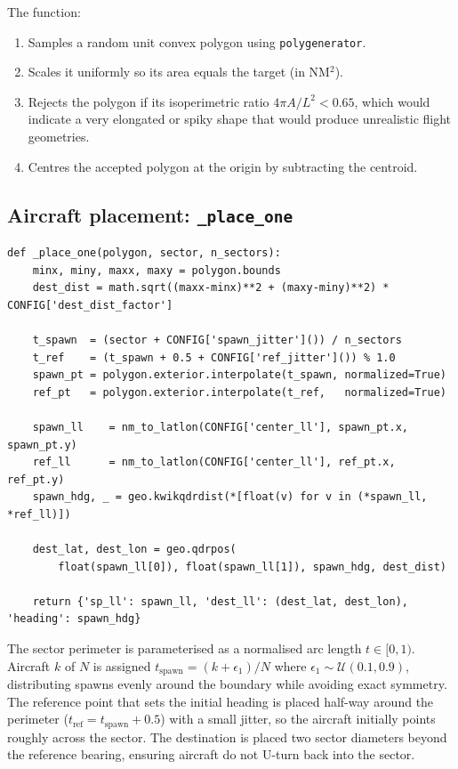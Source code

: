 \documentclass[11pt, a4paper]{article}
\begin{document}
The function:
\begin{enumerate}[noitemsep]
  \item Samples a random unit convex polygon using \texttt{polygenerator}.
  \item Scales it uniformly so its area equals the target (in NM$^2$).
  \item Rejects the polygon if its isoperimetric ratio $4\pi A / L^2 < 0.65$,
        which would indicate a very elongated or spiky shape that would produce
        unrealistic flight geometries.
  \item Centres the accepted polygon at the origin by subtracting the centroid.
\end{enumerate}

\subsection{Aircraft placement: \texttt{\_place\_one}}

\begin{lstlisting}[caption={Placing one aircraft on the sector boundary.}]
def _place_one(polygon, sector, n_sectors):
    minx, miny, maxx, maxy = polygon.bounds
    dest_dist = math.sqrt((maxx-minx)**2 + (maxy-miny)**2) * CONFIG['dest_dist_factor']

    t_spawn  = (sector + CONFIG['spawn_jitter']()) / n_sectors
    t_ref    = (t_spawn + 0.5 + CONFIG['ref_jitter']()) % 1.0
    spawn_pt = polygon.exterior.interpolate(t_spawn, normalized=True)
    ref_pt   = polygon.exterior.interpolate(t_ref,   normalized=True)

    spawn_ll    = nm_to_latlon(CONFIG['center_ll'], spawn_pt.x, spawn_pt.y)
    ref_ll      = nm_to_latlon(CONFIG['center_ll'], ref_pt.x,   ref_pt.y)
    spawn_hdg, _ = geo.kwikqdrdist(*[float(v) for v in (*spawn_ll, *ref_ll)])

    dest_lat, dest_lon = geo.qdrpos(
        float(spawn_ll[0]), float(spawn_ll[1]), spawn_hdg, dest_dist)

    return {'sp_ll': spawn_ll, 'dest_ll': (dest_lat, dest_lon), 'heading': spawn_hdg}
\end{lstlisting}

The sector perimeter is parameterised as a normalised arc length $t \in [0,1)$.
Aircraft $k$ of $N$ is assigned $t_\text{spawn} = (k + \epsilon_1) / N$ where
$\epsilon_1 \sim \mathcal{U}(0.1, 0.9)$, distributing spawns evenly around the
boundary while avoiding exact symmetry.
The reference point that sets the initial heading is placed half-way around the
perimeter ($t_\text{ref} = t_\text{spawn} + 0.5$) with a small jitter, so the
aircraft initially points roughly across the sector.
The destination is placed two sector diameters beyond the reference bearing,
ensuring aircraft do not U-turn back into the sector.
\end{document}
